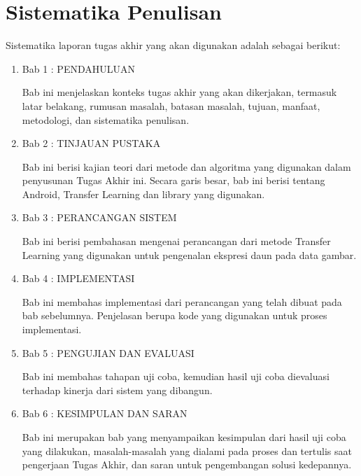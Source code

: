 \section {Sistematika Penulisan}

Sistematika laporan tugas akhir yang akan digunakan adalah sebagai berikut:

\begin{enumerate}
\item Bab 1 : PENDAHULUAN

Bab ini menjelaskan konteks tugas akhir yang akan dikerjakan, termasuk latar belakang, rumusan masalah, batasan masalah, tujuan, manfaat, metodologi, dan sistematika penulisan.

\item Bab 2 : TINJAUAN PUSTAKA

Bab ini berisi kajian teori dari metode dan algoritma yang digunakan dalam penyusunan Tugas Akhir ini. Secara garis besar, bab ini berisi tentang Android, Transfer Learning dan library yang digunakan.

\item Bab 3 :  PERANCANGAN SISTEM

Bab ini berisi pembahasan mengenai perancangan dari metode Transfer Learning yang digunakan untuk pengenalan ekspresi daun pada data gambar.

\item Bab 4 : IMPLEMENTASI

Bab ini membahas implementasi dari perancangan yang telah dibuat pada bab sebelumnya. Penjelasan berupa kode yang digunakan untuk proses implementasi.

\item Bab 5 : PENGUJIAN DAN EVALUASI

Bab ini membahas tahapan uji coba, kemudian hasil uji coba dievaluasi terhadap kinerja dari sistem yang dibangun.

\item Bab 6 : KESIMPULAN DAN SARAN

Bab ini merupakan bab yang menyampaikan kesimpulan dari hasil uji coba yang dilakukan, masalah-masalah yang dialami pada proses dan tertulis saat pengerjaan Tugas Akhir, dan saran untuk  pengembangan solusi kedepannya.

\end{enumerate}